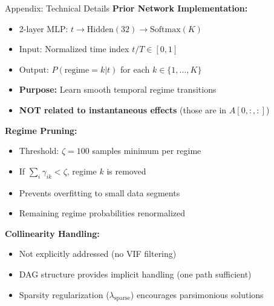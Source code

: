 \documentclass[aspectratio=169]{beamer}
\begin{document}
\begin{frame}{Appendix: Technical Details}
\textbf{Prior Network Implementation:}
\begin{itemize}
    \item 2-layer MLP: $t \to \text{Hidden}(32) \to \text{Softmax}(K)$
    \item Input: Normalized time index $t/T \in [0,1]$
    \item Output: $P(\text{regime}=k | t)$ for each $k \in \{1, \ldots, K\}$
    \item \textbf{Purpose:} Learn smooth temporal regime transitions
    \item \textbf{NOT related to instantaneous effects} (those are in $A[0,:,:]$)
\end{itemize}

\vspace{0.1cm}
\textbf{Regime Pruning:}
\begin{itemize}
    \item Threshold: $\zeta = 100$ samples minimum per regime
    \item If $\sum_i \gamma_{ik} < \zeta$, regime $k$ is removed
    \item Prevents overfitting to small data segments
    \item Remaining regime probabilities renormalized
\end{itemize}

\vspace{0.1cm}
\textbf{Collinearity Handling:}
\begin{itemize}
    \item Not explicitly addressed (no VIF filtering)
    \item DAG structure provides implicit handling (one path sufficient)
    \item Sparsity regularization ($\lambda_{\text{sparse}}$) encourages parsimonious solutions
\end{itemize}
\end{frame}
\end{document}
